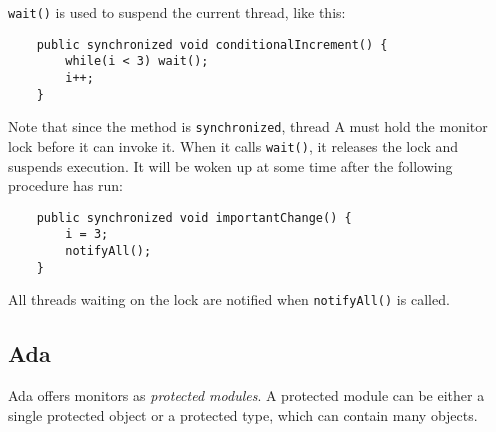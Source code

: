\texttt{wait()} is used to suspend the current thread, like this:
\begin{verbatim}
    public synchronized void conditionalIncrement() {
        while(i < 3) wait();
        i++;
    }
\end{verbatim}
Note that since the method is \texttt{synchronized}, thread A must hold the monitor lock before it can invoke it. When it calls \texttt{wait()}, it releases the lock and suspends execution. It will be woken up at some time after the following procedure has run:
\begin{verbatim}
    public synchronized void importantChange() {
        i = 3;
        notifyAll();
    }
\end{verbatim} 
All threads waiting on the lock are notified when \texttt{notifyAll()} is called.

\subsection{Ada}
Ada offers monitors as \emph{protected modules}. A protected module can be either a single protected object or a protected type, which can contain many objects. 
